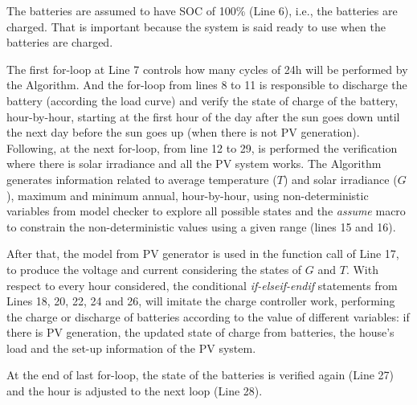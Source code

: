 \documentclass[review]{elsarticle}
\begin{document}
The batteries are assumed to have SOC of 100\% (Line 6), i.e., the batteries are charged. That is important because the system is said ready to use when the batteries are charged.

The first for-loop at Line 7 controls how many cycles of 24h will be performed by the Algorithm.  And the for-loop from lines 8 to 11 is responsible to discharge the battery (according the load curve) and verify the state of charge of the battery, hour-by-hour, starting at the first hour of the day after the sun goes down until the next day before the sun goes up (when there is not PV generation). Following, at the next for-loop, from line 12 to 29, is performed the verification where there is solar irradiance and all the PV system works. The Algorithm generates information related to average temperature ($T$) and solar irradiance ($G$), maximum and minimum annual, hour-by-hour, using non-deterministic variables from model checker to explore all possible states and the \textit{assume} macro to constrain the non-deterministic values using a given range (lines 15 and 16). 

After that, the model from PV generator is used in the function call of Line 17, to produce the voltage and current considering the states of $G$ and $T$. With respect to every hour considered, the conditional \textit{if-elseif-endif} statements from Lines 18, 20, 22, 24 and 26, will imitate the charge controller work, performing the charge or discharge of batteries according to the value of different variables: if there is PV generation, the updated state of charge from batteries, the house's load and the set-up information of the PV system.

At the end of last for-loop, the state of the batteries is verified again (Line 27) and the hour is adjusted to the next loop (Line 28).
\end{document}
